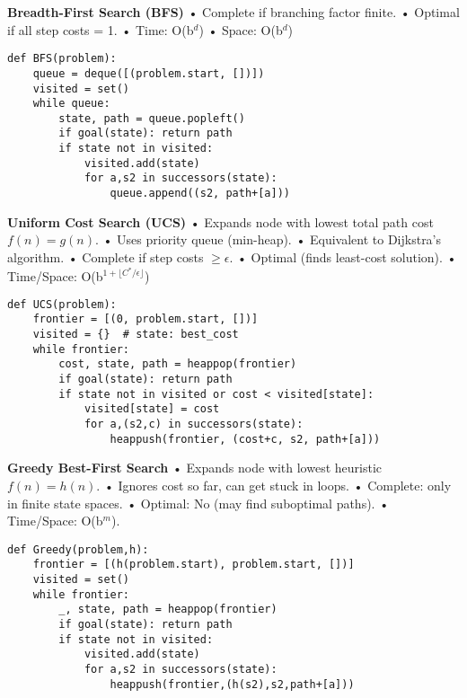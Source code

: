 ﻿\documentclass[10pt]{article}
\begin{document}
\begin{multicols*}{2}
\textbf{Breadth-First Search (BFS)}  
• Complete if branching factor finite.  
• Optimal if all step costs = 1.  
• Time: O(b$^d$) \quad • Space: O(b$^d$)  
\begin{minipage}{\linewidth}
\begin{lstlisting}
def BFS(problem):
    queue = deque([(problem.start, [])])
    visited = set()
    while queue:
        state, path = queue.popleft()
        if goal(state): return path
        if state not in visited:
            visited.add(state)
            for a,s2 in successors(state):
                queue.append((s2, path+[a]))
\end{lstlisting}
\end{minipage}

\textbf{Uniform Cost Search (UCS)}  
• Expands node with lowest total path cost $f(n) = g(n)$.  
• Uses priority queue (min-heap).  
• Equivalent to Dijkstra’s algorithm.  
• Complete if step costs $\geq \epsilon$.  
• Optimal (finds least-cost solution).  
• Time/Space: O(b$^{1+\lfloor C^*/\epsilon \rfloor}$)  
\begin{minipage}{\linewidth}
\begin{lstlisting}
def UCS(problem):
    frontier = [(0, problem.start, [])]
    visited = {}  # state: best_cost
    while frontier:
        cost, state, path = heappop(frontier)
        if goal(state): return path
        if state not in visited or cost < visited[state]:
            visited[state] = cost
            for a,(s2,c) in successors(state):
                heappush(frontier, (cost+c, s2, path+[a]))
\end{lstlisting}
\end{minipage}

\textbf{Greedy Best-First Search}  
• Expands node with lowest heuristic $f(n) = h(n)$.  
• Ignores cost so far, can get stuck in loops.  
• Complete: only in finite state spaces.  
• Optimal: No (may find suboptimal paths).  
• Time/Space: O(b$^m$).  
\begin{minipage}{\linewidth}
\begin{lstlisting}
def Greedy(problem,h):
    frontier = [(h(problem.start), problem.start, [])]
    visited = set()
    while frontier:
        _, state, path = heappop(frontier)
        if goal(state): return path
        if state not in visited:
            visited.add(state)
            for a,s2 in successors(state):
                heappush(frontier,(h(s2),s2,path+[a]))
\end{lstlisting}
\end{minipage}


\end{multicols*}
\end{document}
